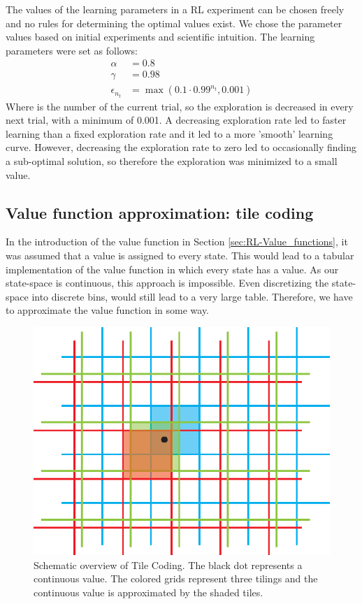 The values of the learning parameters in a \ac{RL} experiment can be chosen freely and no rules for determining the optimal values exist. We chose the parameter values based on initial experiments and scientific intuition. The learning parameters were set as follows: 
$$
	\begin{aligned}
		\alpha &= 0.8 \\ 
		\gamma &= 0.98 \\
		\epsilon_{n_t} &= \max(0.1\cdot0.99^{n_t},0.001)
	\end{aligned}
$$
Where  is the number of the current trial, so the exploration is decreased in every next trial, with a minimum of 0.001. A decreasing exploration rate led to faster learning than a fixed exploration rate and it led to a more 'smooth' learning curve. However, decreasing the exploration rate to zero led to occasionally finding a sub-optimal solution, so therefore the exploration was minimized to a small value. 


\subsection{Value function approximation: tile coding}\label{sec:PS-learning problem tile coding}
In the introduction of the value function in Section \ref{sec:RL-Value_functions}, it was assumed that a value is assigned to every state. This would lead to a tabular implementation of the value function in which every state has a value. As our state-space is continuous, this approach is impossible. Even discretizing the state-space into discrete bins, would still lead to a very large table. Therefore, we have to approximate the value function in some way.
\begin{figure}[htbp]
	\centering
		\includegraphics[width=.5\textwidth]{img/TileCoding}
	\caption[Tile Coding]{Schematic overview of Tile Coding. The black dot represents a continuous value. The colored grids represent three tilings and the continuous value is approximated by the shaded tiles.}
	\label{fig:PS-TileCoding}
\end{figure}

